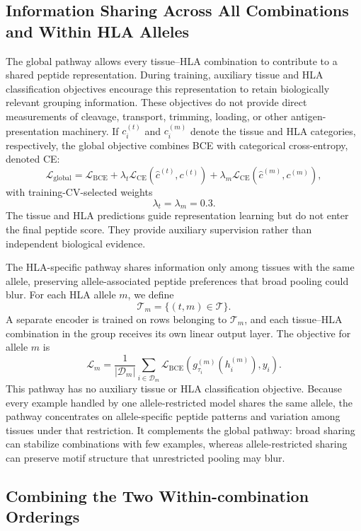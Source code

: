 \subsection{Information Sharing Across All Combinations and Within HLA Alleles}

The global pathway allows every tissue--HLA combination to contribute to a shared peptide representation. During training, auxiliary tissue and HLA classification objectives encourage this representation to retain biologically relevant grouping information. These objectives do not provide direct measurements of cleavage, transport, trimming, loading, or other antigen-presentation machinery. If \(c_i^{(t)}\) and \(c_i^{(m)}\) denote the tissue and HLA categories, respectively, the global objective combines BCE with categorical cross-entropy, denoted CE:
\[
\mathcal{L}_{\mathrm{global}}
=
\mathcal{L}_{\mathrm{BCE}}
+
\lambda_t
\mathcal{L}_{\mathrm{CE}}
\left(
\widehat{c}^{(t)},c^{(t)}
\right)
+
\lambda_m
\mathcal{L}_{\mathrm{CE}}
\left(
\widehat{c}^{(m)},c^{(m)}
\right),
\]
with training-CV-selected weights
\[
\lambda_t=\lambda_m=0.3.
\]
The tissue and HLA predictions guide representation learning but do not enter the final peptide score. They provide auxiliary supervision rather than independent biological evidence.

The HLA-specific pathway shares information only among tissues with the same allele, preserving allele-associated peptide preferences that broad pooling could blur. For each HLA allele \(m\), we define
\[
\mathcal{T}_m
=
\{(t,m)\in\mathcal{T}\}.
\]
A separate encoder is trained on rows belonging to \(\mathcal{T}_m\), and each tissue--HLA combination in the group receives its own linear output layer. The objective for allele \(m\) is
\[
\mathcal{L}_{m}
=
\frac{1}{|\mathcal{D}_m|}
\sum_{i\in\mathcal{D}_m}
\mathcal{L}_{\mathrm{BCE}}
\left(
g^{(m)}_{\tau_i}(h_i^{(m)}),y_i
\right).
\]
This pathway has no auxiliary tissue or HLA classification objective. Because every example handled by one allele-restricted model shares the same allele, the pathway concentrates on allele-specific peptide patterns and variation among tissues under that restriction. It complements the global pathway: broad sharing can stabilize combinations with few examples, whereas allele-restricted sharing can preserve motif structure that unrestricted pooling may blur.

\subsection{Combining the Two Within-combination Orderings}


